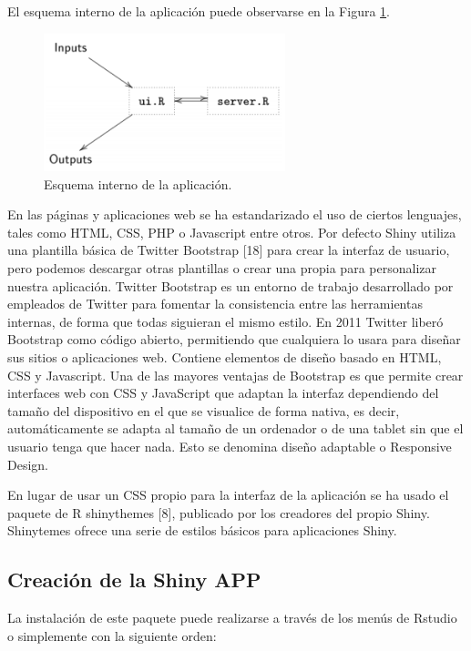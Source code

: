 El esquema interno de la aplicación puede observarse en la Figura \ref{fig:fig31}. 

\begin{figure}[h]
\begin{center}
\includegraphics[width=7cm]{./Graficos/figura7}
\end{center}
\caption{Esquema interno de la aplicación.}
\label{fig:fig31}
\end{figure}


En las páginas y aplicaciones web se ha estandarizado el uso de ciertos lenguajes, tales como HTML, CSS, PHP o Javascript entre otros. Por defecto Shiny utiliza una plantilla básica de Twitter Bootstrap [18] para crear la interfaz de usuario, pero podemos descargar otras plantillas o crear una propia para personalizar nuestra aplicación. Twitter Bootstrap es un entorno de trabajo desarrollado por empleados de Twitter para fomentar la consistencia entre las herramientas internas, de forma que todas siguieran el mismo estilo. En 2011 Twitter liberó Bootstrap como código abierto, permitiendo que cualquiera lo usara para diseñar sus sitios o aplicaciones web. Contiene elementos de diseño basado en HTML, CSS y Javascript. Una de las mayores ventajas de Bootstrap es que permite crear interfaces web con CSS y JavaScript que adaptan la interfaz dependiendo del tamaño del dispositivo en el que se visualice de forma nativa, es decir, automáticamente se adapta al tamaño de un ordenador o de una tablet sin que el usuario tenga que hacer nada. Esto se denomina diseño adaptable o Responsive Design.

En lugar de usar un CSS propio para la interfaz de la aplicación se ha usado el paquete de R shinythemes [8], publicado por los creadores del propio Shiny. Shinytemes ofrece una serie de estilos básicos para aplicaciones Shiny.



\subsection{Creación de la Shiny APP}
La instalación de este paquete puede realizarse a través de los menús de Rstudio o simplemente con la siguiente orden:\\


